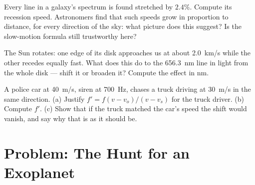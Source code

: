 \begin{exercise}[$\star\star\star$]\label{exo:g12:doppler-effect:13}
Every line in a galaxy's spectrum is found stretched by $2.4\%$. Compute its recession speed.
Astronomers find that such speeds grow in proportion to distance, for every direction of the
sky: what picture does this suggest? Is the slow-motion formula still trustworthy here?
\end{exercise}

\begin{exercise}[$\star\star\star$]\label{exo:g12:doppler-effect:14}
The Sun rotates: one edge of its disk approaches us at about \qty{2.0}{km/s} while the other
recedes equally fast. What does this do to the \qty{656.3}{nm} line in light from the whole
disk --- shift it or broaden it? Compute the effect in \unit{nm}.
\end{exercise}

\begin{exercise}[$\star\star\star$]\label{exo:g12:doppler-effect:15}
A police car at \qty{40}{m/s}, siren at \qty{700}{Hz}, chases a truck driving at \qty{30}{m/s}
in the same direction. (a) Justify $f' = f(v - v_o)/(v - v_s)$ for the truck driver.
(b) Compute $f'$. (c) Show that if the truck matched the car's speed the shift would vanish,
and say why that is as it should be.
\end{exercise}

\section{Problem: The Hunt for an Exoplanet}

